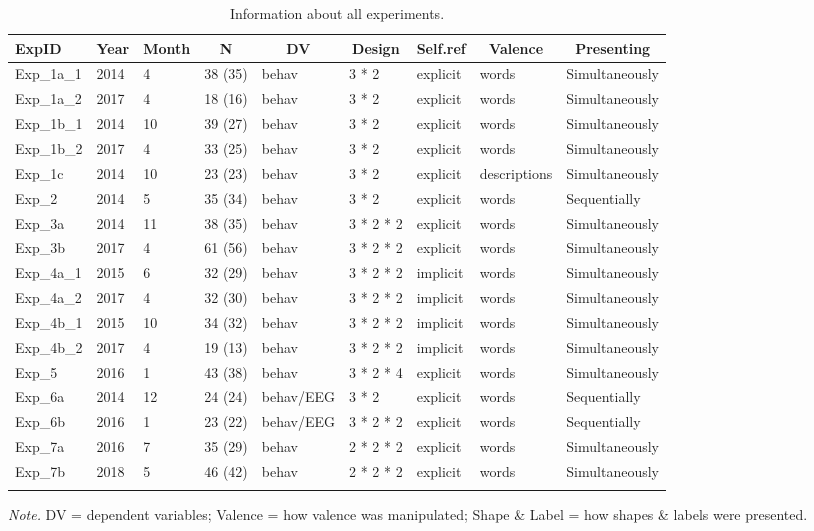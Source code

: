 \documentclass[
  man]{apa6}
\begin{document}
\begin{table}[tbp]
\begin{center}
\begin{threeparttable}
\caption{\label{tab:Table1_exp_info}Information about all experiments.}
\begin{tabular}{lllllllll}
\toprule
ExpID & \multicolumn{1}{c}{Year} & \multicolumn{1}{c}{Month} & \multicolumn{1}{c}{N} & \multicolumn{1}{c}{DV} & \multicolumn{1}{c}{Design} & \multicolumn{1}{c}{Self.ref} & \multicolumn{1}{c}{Valence} & \multicolumn{1}{c}{Presenting}\\
\midrule
Exp\_1a\_1 & 2014 & 4 & 38 (35) & behav & 3 * 2 & explicit & words & Simultaneously\\
Exp\_1a\_2 & 2017 & 4 & 18 (16) & behav & 3 * 2 & explicit & words & Simultaneously\\
Exp\_1b\_1 & 2014 & 10 & 39 (27) & behav & 3 * 2 & explicit & words & Simultaneously\\
Exp\_1b\_2 & 2017 & 4 & 33 (25) & behav & 3 * 2 & explicit & words & Simultaneously\\
Exp\_1c & 2014 & 10 & 23 (23) & behav & 3 * 2 & explicit & descriptions & Simultaneously\\
Exp\_2 & 2014 & 5 & 35 (34) & behav & 3 * 2 & explicit & words & Sequentially\\
Exp\_3a & 2014 & 11 & 38 (35) & behav & 3 * 2 * 2 & explicit & words & Simultaneously\\
Exp\_3b & 2017 & 4 & 61 (56) & behav & 3 * 2 * 2 & explicit & words & Simultaneously\\
Exp\_4a\_1 & 2015 & 6 & 32 (29) & behav & 3 * 2 * 2 & implicit & words & Simultaneously\\
Exp\_4a\_2 & 2017 & 4 & 32 (30) & behav & 3 * 2 * 2 & implicit & words & Simultaneously\\
Exp\_4b\_1 & 2015 & 10 & 34 (32) & behav & 3 * 2 * 2 & implicit & words & Simultaneously\\
Exp\_4b\_2 & 2017 & 4 & 19 (13) & behav & 3 * 2 * 2 & implicit & words & Simultaneously\\
Exp\_5 & 2016 & 1 & 43 (38) & behav & 3 * 2 * 4 & explicit & words & Simultaneously\\
Exp\_6a & 2014 & 12 & 24 (24) & behav/EEG & 3 * 2 & explicit & words & Sequentially\\
Exp\_6b & 2016 & 1 & 23 (22) & behav/EEG & 3 * 2 * 2 & explicit & words & Sequentially\\
Exp\_7a & 2016 & 7 & 35 (29) & behav & 2 * 2 * 2 & explicit & words & Simultaneously\\
Exp\_7b & 2018 & 5 & 46 (42) & behav & 2 * 2 * 2 & explicit & words & Simultaneously\\
\bottomrule
\addlinespace
\end{tabular}
\begin{tablenotes}[para]
\normalsize{\textit{Note.} DV = dependent variables; Valence = how valence was manipulated; Shape \& Label = how shapes \& labels were presented.}
\end{tablenotes}
\end{threeparttable}
\end{center}
\end{table}
\end{document}

